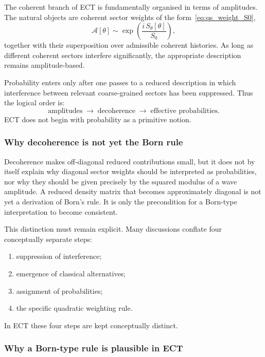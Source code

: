 \documentclass[11pt,a4paper]{article}
\numberwithin{equation}{section}
\begin{document}
The coherent branch of ECT is fundamentally organised in terms of
amplitudes.
The natural objects are coherent sector weights of the
form~\eqref{eq:qs_weight_S0},
\[
  \mathcal{A}[\theta]
  \sim
  \exp\!\left(\frac{i\,S_\theta[\theta]}{S_0}\right),
\]
together with their superposition over admissible coherent histories.
As long as different coherent sectors interfere significantly, the
appropriate description remains amplitude-based.

Probability enters only after one passes to a reduced description in
which interference between relevant coarse-grained sectors has been
suppressed.
Thus the logical order is:
\begin{equation}
  \label{eq:qs_prob_logic}
  \text{amplitudes}
  \;\longrightarrow\;
  \text{decoherence}
  \;\longrightarrow\;
  \text{effective probabilities}.
\end{equation}
ECT does not begin with probability as a primitive notion.

\subsubsection*{Why decoherence is not yet the Born rule}

Decoherence makes off-diagonal reduced contributions small, but it
does not by itself explain why diagonal sector weights should be
interpreted as probabilities, nor why they should be given precisely
by the squared modulus of a wave amplitude.
A reduced density matrix that becomes approximately diagonal is not yet
a derivation of Born's rule.
It is only the precondition for a Born-type interpretation to become
consistent.

This distinction must remain explicit.
Many discussions conflate four conceptually separate steps:
\begin{enumerate}[label=(\roman*)]
  \item suppression of interference;
  \item emergence of classical alternatives;
  \item assignment of probabilities;
  \item the specific quadratic weighting rule.
\end{enumerate}
In ECT these four steps are kept conceptually distinct.

\subsubsection*{Why a Born-type rule is plausible in ECT}
\end{document}
